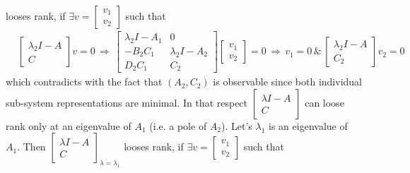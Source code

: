 \documentclass[twoside]{article}
\begin{document}
looses rank, if $\exists v = \begin{bmatrix} v_1 \\ v_2 \end{bmatrix}$ such that 
%
\begin{align*}
	&\left[ \begin{array}{c} \lambda_2 I - A \\ \hline C \end{array} \right] v = 0
	\, \Rightarrow \, 
	\left[ \begin{array}{c|c} \lambda_2 I - A_1 & 0 \\ \hline -B_2 C_1 &  \lambda_2 I - A_2 \\ \hline 
	D_2 C_1 & C_2
	\end{array} \right]  \begin{bmatrix} v_1 \\ v_2 \end{bmatrix} = 0
		\, \Rightarrow \, v_1 = 0 \, \& \, \left[ \begin{array}{c} \lambda_2 I - A \\ \hline C_2 \end{array} \right] v_2 = 0
\end{align*}
%
which contradicts with the fact that $(A_2,C_2)$ is observable since both individual sub-system representations are minimal. 
In that respect $\left[ \begin{array}{c} \lambda I - A \\ \hline C \end{array} \right]$ can loose rank only at an eigenvalue
of $A_1$ (i.e. a pole of $A_2$). Let's $\lambda_1$ is an eigenvalue of $A_1$.
Then $\left[ \begin{array}{c} \lambda I - A \\ \hline C \end{array} \right]_{\lambda = \lambda_1}$ 
looses rank, if $\exists v = \begin{bmatrix} v_1 \\ v_2 \end{bmatrix}$ such that 
%
\end{document}
